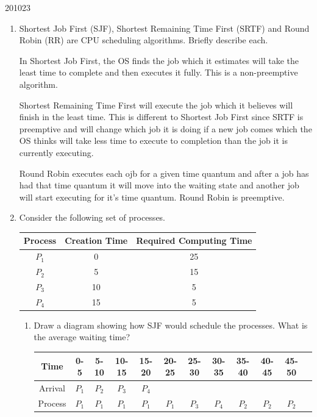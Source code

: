 \documentclass[10pt,\jkfside,a4paper]{article}
\begin{document}
\begin{examquestion}{2010}{2}{3}

\begin{enumerate}

\item Shortest Job First (SJF), Shortest Remaining Time First (SRTF) and Round
Robin (RR) are CPU scheduling algorithms. Briefly describe each.

In Shortest Job First, the OS finds the job which it estimates will take the least time to complete 
and then executes it fully. This is a non-preemptive algorithm.

Shortest Remaining Time First will execute the job which it believes will finish in the least time. 
This is different to Shortest Job First since SRTF is preemptive and will change which job it is 
doing if a new job comes which the OS thinks will take less time to execute to completion than the 
job it is currently executing.

Round Robin executes each ojb for a given time quantum and after a job has had that time quantum it 
will move into the waiting state and another job will start executing for it's time quantum.
Round Robin is preemptive.

\item Consider the following set of processes.
\begin{center}
\begin{tabular}{c c c}
Process & Creation Time & Required Computing Time \\
\hline
$P_1$	& 0				& 25\\
$P_2$	& 5				& 15\\
$P_3$	& 10			& 5\\
$P_4$	& 15			& 5\\
\hline
\end{tabular}
\end{center}

\begin{enumerate}

\item  Draw a diagram showing how SJF would schedule the processes. What is
the average waiting time?

\begin{tabular}{c|ccccccccccc}
Time & 0-5 & 5-10 & 10-15 & 15-20 & 20-25 & 25-30 & 30-35 & 35-40 & 40-45 & 45-50 \\
\hline
Arrival & $P_1$ & $P_2$ & $P_3$ & $P_4$ & & & & & \\
Process & $P_1$ & $P_1$ & $P_1$ & $P_1$ & $P_1$ & $P_3$ & $P_4$ & $P_2$ & $P_2$ & $P_2$ \\
\end{tabular}


\end{enumerate}
\end{enumerate}
\end{examquestion}
\end{document}
